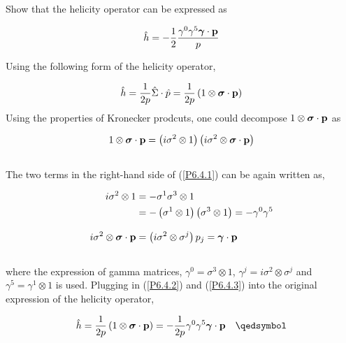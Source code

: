 \begin{problem}{6.4}
    Show that the helicity operator can be expressed as

    \begin{align*}
        \hat{h} = - \frac{1}{2} \frac{\gamma^0\gamma^5\boldsymbol{\gamma}\cdot\mathbf{p}}{p}\\
    \end{align*}
\end{problem}
\begin{solution}
Using the following form of the helicity operator, 

\begin{align*}
    \hat{h} = \frac{1}{2p} \hat{\Sigma} \cdot \hat{p} = \frac{1}{2p} \left(1\otimes \boldsymbol{\sigma}\cdot\mathbf{p}\right)\\
\end{align*}
Using the properties of Kronecker prodcuts, one could decompose $1\otimes \boldsymbol{\sigma}\cdot\mathbf{p}$ as 

\begin{align} \label{P6.4.1}
    1\otimes \boldsymbol{\sigma}\cdot\mathbf{p} = \left(i\sigma^2 \otimes 1 \right)  \left(i\sigma^2 \otimes  \boldsymbol{\sigma}\cdot\mathbf{p}  \right)  \\ \nonumber
\end{align}
The two terms in the right-hand side of (\ref{P6.4.1}) can be again written as, 

\begin{align}
     i\sigma^2 \otimes 1 &= -\sigma^1\sigma^3 \otimes 1 \nonumber \\  \label{P6.4.2}
                         &= -\left(\sigma^1\otimes 1\right)  \left(\sigma^3\otimes 1\right) = -\gamma^0 \gamma^5  \\[0.12in]  \label{P6.4.3}
    i\sigma^2 \otimes  \boldsymbol{\sigma}\cdot\mathbf{p} &=  \left(i\sigma^2 \otimes \sigma^j\right)p_j = \boldsymbol{\gamma} \cdot \mathbf{p} \\ \nonumber
\end{align}
where the expression of gamma matrices, $\gamma^0 = \sigma^3 \otimes 1$, $\gamma^j=i\sigma^2\otimes\sigma^j$ and $\gamma^5=\gamma^1\otimes 1$ is used. Plugging in (\ref{P6.4.2}) and (\ref{P6.4.3}) into the original expression of the helicity operator,

\begin{align*}
    \hat{h} =  \frac{1}{2p} \left(1\otimes \boldsymbol{\sigma}\cdot\boldp\right) = -\frac{1}{2p} \gamma^0 \gamma^5 \boldsymbol{\gamma} \cdot \boldp  \qed \\
\end{align*}
\end{solution}

